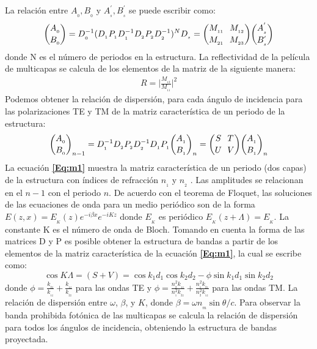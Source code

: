\documentclass[a4paper,11pt,]{book}
\begin{document}
La relación entre $ A_{_{0}}, B_{_{0}} $ y $ A^{'}_{_{s}}, B^{'}_{_{s}} $ se puede escribir como:
\begin{equation}
{A_{_{0}} \choose B_{_{0}}} = D^{-1}_{_{0}}(D_{_{1}} P_{_{1}}D^{-1}_{_{1}}D_{_{2}}P_{_{2}}D^{-1}_{_{2}})^{N}D_{_{s}}={M_{_{11}} \\  \ \ M_{_{12}} \choose M_{_{21}} \\ \ \ M_{_{23}} }{A^{'}_{_{s}} \choose B^{'}_{_{s}}}
\end{equation}
donde N es el número de periodos en la estructura. La reflectividad de la película de multicapas se calcula de los elementos de la matriz de la siguiente manera:
\begin{eqnarray}
R= \bigg \vert\frac{M_{_{12}}}{M_{_{11}}} \bigg \vert^{2}
\end{eqnarray}
Podemos obtener la relación de dispersión, para cada ángulo de incidencia para las polarizaciones TE y TM de la matriz característica de un periodo de la estructura:
\begin{equation}\label{Eq:m1}
{A_{_{0}} \choose B_{_{0}}}_{n-1} = D^{-1}_{_{1}}D_{_{2}} P_{_{2}}D^{-1}_{_{2}}D_{_{1}}P_{_{1}}{A_{_{1}} \choose B_{_{1}}}_{n}={S \\  \ \ T \choose U \\ \ \ V }{A_{_{1}} \choose B_{_{1}}}_{n}
\end{equation}
La ecuación \textbf{\ref{Eq:m1}} muestra la matriz característica de un periodo (dos capas) de la estructura con índices de refracción $n_{_{1}}$ y $n_{_{2}}$ . Las amplitudes se relacionan en el  $n-1$ con el periodo $n$. De acuerdo con el teorema de Floquet, las soluciones de las ecuaciones de onda para un medio periódico son de la forma
$E(z, x) = E_{_{K}}(z)e^{-i\beta x}e^{-iKz} $ donde $E_{_{K}}$ es periódico $E_{_{K}}(z + \Lambda) = E_{_{K}}$. La constante K es el número de onda de Bloch. Tomando en cuenta la forma de las matrices D y P es posible obtener la estructura de bandas a partir de los elementos de la matriz característica de la ecuación \textbf{\ref{Eq:m1}}, la cual se escribe como:
\begin{equation}\label{Eq:m2}
\cos K \Lambda = (S +V ) = \cos k_{1} d_{1} \cos k_{2} d_{2}-\phi \sin k_{1} d_{1} \sin k_{2} d_{2}
\end{equation}
donde $\phi=\frac{k_{_{2z}}}{k_{_{1z}}}+\frac{k_{_{1z}}}{k_{_{2z}}}$ para las ondas TE y $\phi=\frac{n^{2}_{_{2}}k_{_{1z}}}{n^{2}_{_{1}}k_{_{2z}}}+\frac{n^{2}_{_{1}}k_{_{2z}}}{n^{2}_{_{2}}k_{_{1z}}}$ para las ondas TM.
La relación de dispersión entre $\omega$, $\beta$, y $K$, donde $\beta=\omega n_{_{m}} \sin \theta/c$. Para observar la banda prohibida fotónica de las multicapas se calcula la relación de dispersión para todos los ángulos de incidencia, obteniendo la estructura de bandas proyectada. \\\\
\end{document}
